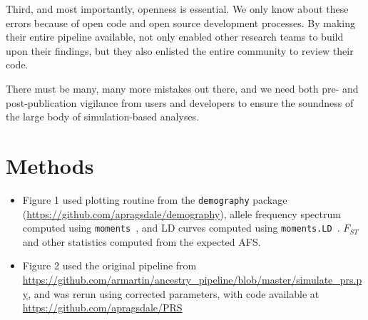 \documentclass{article}
\begin{document}
Third, and most importantly, openness is essential. We only know about these errors because of open code and
open source development processes. By making their entire pipeline available, \citet{martin2017human} not only 
enabled other research teams to build upon their findings, but they also enlisted the entire community to review their code. 

There must be many, many more mistakes out there, and we need both pre- and post-publication vigilance from 
users and developers to ensure the soundness of the large body of simulation-based analyses. 


\section{Methods}

\begin{itemize}
\item Figure 1 used plotting routine from the \texttt{demography} package (\url{https://github.com/apragsdale/demography}),
allele frequency spectrum computed using \texttt{moments}~\citep{jouganous2017inferring}, and LD curves
computed using \texttt{moments.LD}~\citep{ragsdale2019models}. $F_{ST}$ and other statistics computed
from the expected AFS.
\item Figure 2 used the original pipeline from \url{https://github.com/armartin/ancestry_pipeline/blob/master/simulate_prs.py},
and was rerun using corrected parameters, with code available at \url{https://github.com/apragsdale/PRS}
\end{itemize}




\pagebreak
\end{document}
